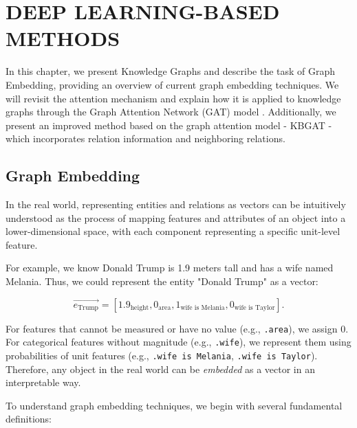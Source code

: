 \chapter{DEEP LEARNING-BASED METHODS}
\label{chap:DeeLearning}

In this chapter, we present Knowledge Graphs and describe the task of Graph Embedding, providing an overview of current graph embedding techniques. We will revisit the attention mechanism and explain how it is applied to knowledge graphs through the Graph Attention Network (GAT) model \cite{velivckovic2017graph}. Additionally, we present an improved method based on the graph attention model - KBGAT \cite{nathani2019learning} - which incorporates relation information and neighboring relations.

\section{Graph Embedding}
\label{sec:graphEmbedding}

In the real world, representing entities and relations as vectors can be intuitively understood as the process of mapping features and attributes of an object into a lower-dimensional space, with each component representing a specific unit-level feature.

For example, we know Donald Trump is 1.9 meters tall and has a wife named Melania. Thus, we could represent the entity "Donald Trump" as a vector:

\[
\overrightarrow{e_\text{Trump}} = [1.9_{\text{height}}, 0_{\text{area}}, 1_{\text{wife is Melania}}, 0_{\text{wife is Taylor}}].
\]

For features that cannot be measured or have no value (e.g., \texttt{.area}), we assign 0. For categorical features without magnitude (e.g., \texttt{.wife}), we represent them using probabilities of unit features (e.g., \texttt{.wife is Melania}, \texttt{.wife is Taylor}). Therefore, any object in the real world can be \textit{embedded} as a vector in an interpretable way.

To understand graph embedding techniques, we begin with several fundamental definitions:

